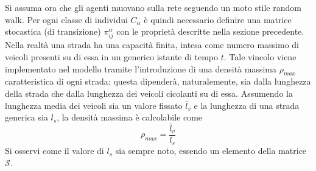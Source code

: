 \documentclass[../main.tex]{subfiles}
\begin{document}
Si assuma ora che gli agenti muovano sulla rete seguendo un moto stile random walk.
Per ogni classe di individui $C_{\alpha}$ \`e quindi necessario definire una matrice stocastica (di transizione) $\pi_{ij}^{\alpha}$ con le propriet\`a descritte nella sezione precedente.
Nella realt\`a una strada ha una capacit\`a finita, intesa come numero massimo di veicoli presenti su di essa in un generico istante di tempo $t$.
Tale vincolo viene implementato nel modello tramite l'introduzione di una densit\`a massima $\rho_{max}$ caratteristica di ogni strada: questa dipender\`a, naturalemente, sia dalla lunghezza della strada che dalla lunghezza dei veicoli cicolanti su di essa.
Assumendo la lunghezza media dei veicoli sia un valore fissato $\bar{l}_v$ e la lunghezza di una strada generica sia $l_s$, la densit\`a massima \`e calcolabile come
\begin{equation}
    \rho_{max}=\frac{\bar{l}_v}{l_s}
    \label{eq:density}
\end{equation}
Si osservi come il valore di $l_s$ sia sempre noto, essendo un elemento della matrice $\mathcal{S}$.
\end{document}
